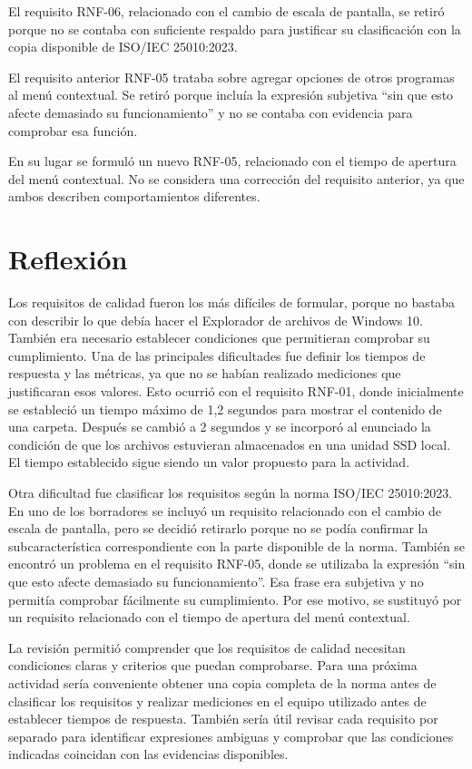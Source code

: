 \documentclass[10pt,a4paper]{article}
\begin{document}
El requisito RNF-06, relacionado con el cambio de escala de pantalla, se retiró porque no se contaba con suficiente respaldo para justificar su clasificación con la copia disponible de ISO/IEC 25010:2023.

El requisito anterior RNF-05 trataba sobre agregar opciones de otros programas al menú contextual. Se retiró porque incluía la expresión subjetiva \enquote{sin que esto afecte demasiado su funcionamiento} y no se contaba con evidencia para comprobar esa función.

En su lugar se formuló un nuevo RNF-05, relacionado con el tiempo de apertura del menú contextual. No se considera una corrección del requisito anterior, ya que ambos describen comportamientos diferentes.

\section{Reflexión}

Los requisitos de calidad fueron los más difíciles de formular, porque no bastaba con describir lo que debía hacer el Explorador de archivos de Windows 10. También era necesario establecer condiciones que permitieran comprobar su cumplimiento. Una de las principales dificultades fue definir los tiempos de respuesta y las métricas, ya que no se habían realizado mediciones que justificaran esos valores. Esto ocurrió con el requisito RNF-01, donde inicialmente se estableció un tiempo máximo de 1,2 segundos para mostrar el contenido de una carpeta. Después se cambió a 2 segundos y se incorporó al enunciado la condición de que los archivos estuvieran almacenados en una unidad SSD local. El tiempo establecido sigue siendo un valor propuesto para la actividad.

Otra dificultad fue clasificar los requisitos según la norma ISO/IEC 25010:2023. En uno de los borradores se incluyó un requisito relacionado con el cambio de escala de pantalla, pero se decidió retirarlo porque no se podía confirmar la subcaracterística correspondiente con la parte disponible de la norma. También se encontró un problema en el requisito RNF-05, donde se utilizaba la expresión \enquote{sin que esto afecte demasiado su funcionamiento}. Esa frase era subjetiva y no permitía comprobar fácilmente su cumplimiento. Por ese motivo, se sustituyó por un requisito relacionado con el tiempo de apertura del menú contextual.

La revisión permitió comprender que los requisitos de calidad necesitan condiciones claras y criterios que puedan comprobarse. Para una próxima actividad sería conveniente obtener una copia completa de la norma antes de clasificar los requisitos y realizar mediciones en el equipo utilizado antes de establecer tiempos de respuesta. También sería útil revisar cada requisito por separado para identificar expresiones ambiguas y comprobar que las condiciones indicadas coincidan con las evidencias disponibles.
\end{document}

